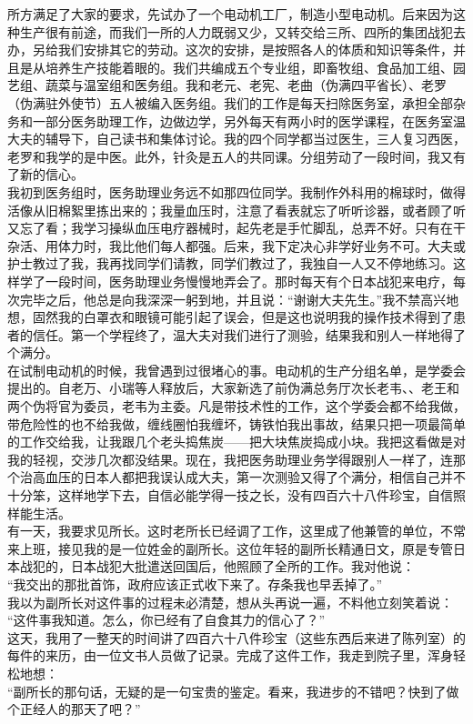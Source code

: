 所方满足了大家的要求，先试办了一个电动机工厂，制造小型电动机。后来因为这种生产很有前途，而我们一所的人力既弱又少，又转交给三所、四所的集团战犯去办，另给我们安排其它的劳动。这次的安排，是按照各人的体质和知识等条件，并且是从培养生产技能着眼的。我们共编成五个专业组，即畜牧组、食品加工组、园艺组、蔬菜与温室组和医务组。我和老元、老宪、老曲（伪满四平省长）、老罗（伪满驻外使节）五人被编入医务组。我们的工作是每天扫除医务室，承担全部杂务和一部分医务助理工作，边做边学，另外每天有两小时的医学课程，在医务室温大夫的辅导下，自己读书和集体讨论。我的四个同学都当过医生，三人复习西医，老罗和我学的是中医。此外，针灸是五人的共同课。分组劳动了一段时间，我又有了新的信心。\\

我初到医务组时，医务助理业务远不如那四位同学。我制作外科用的棉球时，做得活像从旧棉絮里拣出来的；我量血压时，注意了看表就忘了听听诊器，或者顾了听又忘了看；我学习操纵血压电疗器械时，起先老是手忙脚乱，总弄不好。只有在干杂活、用体力时，我比他们每人都强。后来，我下定决心非学好业务不可。大夫或护士教过了我，我再找同学们请教，同学们教过了，我独自一人又不停地练习。这样学了一段时间，医务助理业务慢慢地弄会了。那时每天有个日本战犯来电疗，每次完毕之后，他总是向我深深一躬到地，并且说：“谢谢大夫先生。”我不禁高兴地想，固然我的白罩衣和眼镜可能引起了误会，但是这也说明我的操作技术得到了患者的信任。第一个学程终了，温大夫对我们进行了测验，结果我和别人一样地得了个满分。\\

在试制电动机的时候，我曾遇到过很堵心的事。电动机的生产分组名单，是学委会提出的。自老万、小瑞等人释放后，大家新选了前伪满总务厅次长老韦、、老王和两个伪将官为委员，老韦为主委。凡是带技术性的工作，这个学委会都不给我做，带危险性的也不给我做，缠线圈怕我缠坏，铸铁怕我出事故，结果只把一项最简单的工作交给我，让我跟几个老头捣焦炭——把大块焦炭捣成小块。我把这看做是对我的轻视，交涉几次都没结果。现在，我把医务助理业务学得跟别人一样了，连那个治高血压的日本人都把我误认成大夫，第一次测验又得了个满分，相信自己并不十分笨，这样地学下去，自信必能学得一技之长，没有四百六十八件珍宝，自信照样能生活。\\

有一天，我要求见所长。这时老所长已经调了工作，这里成了他兼管的单位，不常来上班，接见我的是一位姓金的副所长。这位年轻的副所长精通日文，原是专管日本战犯的，日本战犯大批遣送回国后，他照顾了全所的工作。我对他说：\\

“我交出的那批首饰，政府应该正式收下来了。存条我也早丢掉了。”\\

我以为副所长对这件事的过程未必清楚，想从头再说一遍，不料他立刻笑着说：\\

“这件事我知道。怎么，你已经有了自食其力的信心了？”\\

这天，我用了一整天的时间讲了四百六十八件珍宝（这些东西后来进了陈列室）的每件的来历，由一位文书人员做了记录。完成了这件工作，我走到院子里，浑身轻松地想：\\

“副所长的那句话，无疑的是一句宝贵的鉴定。看来，我进步的不错吧？快到了做个正经人的那天了吧？”
